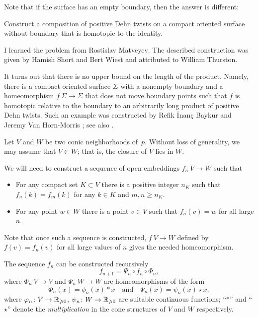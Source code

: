 Note that if the surface has an empty boundary, then the answer is different:

\begin{pr}
Construct a composition of positive Dehn twists on a compact oriented surface without boundary that is homotopic to the identity. 
\end{pr}

I learned the problem from Rostislav Matveyev.
The described construction was given by Hamish Short and Bert Wiest \cite[2.4]{short-wiest} and attributed to William Thurston.

It turns out that there is no upper bound on the length of the product.
Namely, there is a compact oriented surface $\Sigma$ with a nonempty boundary and a homeomorphism $f\:\Sigma\to \Sigma$ that does not move boundary points such that $f$ is homotopic relative to the boundary to an arbitrarily long product of positive Dehn twists.
Such an example was constructed by Refik İnanç Baykur and Jeremy Van Horn-Morris \cite{baykur-vanhornmorris};
see also \cite{baykur-monden-vanhornmorris}.

Let $V$ and $W$ be two conic neighborhoods of~$p$.
Without loss of generality, we may assume that $V\Subset W$;
that is, the closure of $V$ lies in $W$.

We will need to construct a sequence of open embeddings $f_n\:V\to W$
such that 
\begin{itemize}
\item 
For any compact set $K\subset V$ 
there is a positive integer $n_K$ such that
$f_n(k)=f_m(k)$ for any $k\in K$ and $m, n \ge n_K$.
\item For any point $w\in W$ there is a point $v\in V$ such that $f_n(v)=w$ for all large $n$.
\end{itemize}

Note that once such a sequence is constructed, $f\:V\to W$ defined by $f(v)=f_n(v)$ for all large values of $n$ gives the needed homeomorphism.

The sequence $f_n$ can be constructed recursively
\[f_{n+1}=\Psi_n\circ f_n\circ \Phi_n,\]
where $\Phi_n\:V\to V$ 
and $\Psi_n\:W\to W$ 
are homeomorphisms
of the form 
\[\Phi_n(x)=\phi_n(x)\ast x\quad \text{and}\quad \Psi_n(x)=\psi_n(x)\star x,\]
where $\varphi_n\colon V\to \mathbb{R}_{\geqslant 0}$, $\psi_n\colon W\to \mathbb{R}_{\geqslant 0}$ are suitable continuous functions;
``$\ast$'' and ``$\star$'' denote the {}\emph{multiplication} in the cone structures of $V$ and $W$ respectively.\qeds


